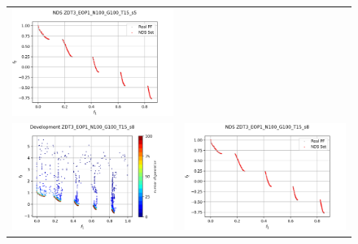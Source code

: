 \begin{figure}[H]
\begin{tabular}{c c}
    \includegraphics[scale=0.45]{figures/ZDT3_EOP1_N100_G100_T15/s5_nds.png}\\
    \includegraphics[scale=0.45]{figures/ZDT3_EOP1_N100_G100_T15/s8_dev.png} &
    \includegraphics[scale=0.45]{figures/ZDT3_EOP1_N100_G100_T15/s8_nds.png}\\

\end{tabular}
\end{figure}
